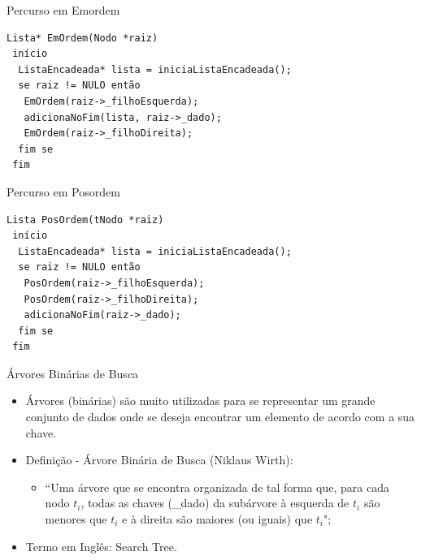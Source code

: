 \documentclass[12pt,table,xcolor={dvipsnames}]{beamer}
\begin{document}
\begin{frame}[fragile]{Percurso em Emordem}
          \begin{lstlisting}
Lista* EmOrdem(Nodo *raiz)
 início
  ListaEncadeada* lista = iniciaListaEncadeada();
  se raiz != NULO então
   EmOrdem(raiz->_filhoEsquerda);
   adicionaNoFim(lista, raiz->_dado);
   EmOrdem(raiz->_filhoDireita);
  fim se
 fim
\end{lstlisting}
\end{frame} 

\begin{frame}[fragile]{Percurso em Posordem}
          \begin{lstlisting}
Lista PosOrdem(tNodo *raiz)
 início
  ListaEncadeada* lista = iniciaListaEncadeada();
  se raiz != NULO então
   PosOrdem(raiz->_filhoEsquerda);
   PosOrdem(raiz->_filhoDireita);
   adicionaNoFim(raiz->_dado);
  fim se
 fim
 \end{lstlisting}
\end{frame} 

\begin{frame}[fragile]{Árvores Binárias de Busca}
          \begin{itemize}
          \item Árvores (binárias) são muito utilizadas para se representar um grande conjunto de dados onde se deseja encontrar um elemento de acordo com a sua chave.
          \item Definição - Árvore Binária de Busca (Niklaus Wirth):
          \begin{itemize}
          \item “Uma árvore que se encontra organizada de tal forma que, para cada nodo $t_i$, todas as chaves (\_dado) da subárvore à esquerda de $t_i$ são menores que $t_i$ e à direita são maiores (ou iguais) que $t_i$";
          \end{itemize}
          \item Termo em Inglês: Search Tree.
       	  \end{itemize}
\end{frame}
\end{document}

